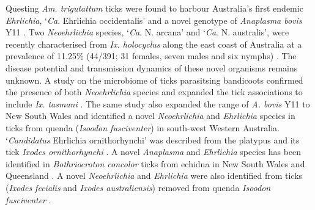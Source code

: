 \documentclass[a4paper, nobind]{templates/ociamthesis}
\begin{document}
Questing \emph{Am. trigutattum} ticks were found to harbour Australia's first endemic \emph{Ehrlichia}, `\emph{Ca}. Ehrlichia occidentalis' and a novel genotype of \emph{Anaplasma bovis} Y11 \autocite{goftonDetectionPhylogeneticCharacterisation2017}.
Two \emph{Neoehrlichia} species, `\emph{Ca}. N. arcana' and `\emph{Ca}. N. australis', were recently characterised from \emph{Ix. holocyclus} along the east coast of Australia at a prevalence of 11.25\% (44/391; 31 females, seven males and six nymphs) \autocite{goftonPhylogeneticCharacterisationTwo2016}.
The disease potential and transmission dynamics of these novel organisms remains unknown.
A study on the microbiome of ticks parasitsing bandicoots confirmed the presence of both \emph{Neoehrlichia} species and expanded the tick associations to include \emph{Ix. tasmani} \autocite{eganBacterialCommunityProfiling2020}.
The same study also expanded the range of \emph{A. bovis} Y11 to New South Wales and identified a novel \emph{Neoehrlichia} and \emph{Ehrlichia} species in ticks from quenda (\emph{Isoodon fusciventer}) in south-west Western Australia.
`\emph{Candidatus} Ehrlichia ornithorhynchi' was described from the platypus and its tick \emph{Ixodes ornithorhynchi} \autocite{goftonNovelEhrlichiaSpecies2018}.
A novel \emph{Anaplasma} and \emph{Ehrlichia} species has been identified in \emph{Bothriocroton concolor} ticks from echidna in New South Wales and Queensland \autocite{lohIdentificationCharacterisationMicroorganisms2018,eganBacterialCommunityProfiling2020}.
A novel \emph{Neoehrlichia} and \emph{Ehrlichia} were also identified from ticks (\emph{Ixodes fecialis} and \emph{Ixodes australiensis}) removed from quenda \emph{Isoodon fusciventer} \autocite{eganBacterialCommunityProfiling2020}.
\end{document}
